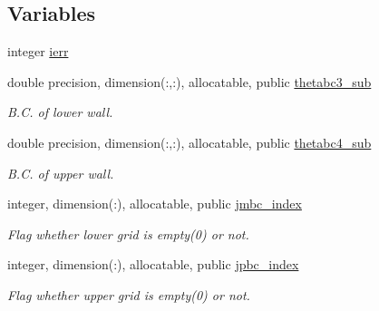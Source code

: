 \subsection*{Variables}
\begin{DoxyCompactItemize}
\item 
integer \mbox{\hyperlink{namespacemodule__mpi__subdomain_a180679cc4b2a39351cff87dcca079484}{ierr}}
\item 
double precision, dimension(\+:,\+:), allocatable, public \mbox{\hyperlink{namespacemodule__mpi__subdomain_a64208c4f25ace4acb038e217cc784f02}{thetabc3\+\_\+sub}}
\begin{DoxyCompactList}\small\item\em B.\+C. of lower wall. \end{DoxyCompactList}\item 
double precision, dimension(\+:,\+:), allocatable, public \mbox{\hyperlink{namespacemodule__mpi__subdomain_a63ecab89051a64282880083d20844204}{thetabc4\+\_\+sub}}
\begin{DoxyCompactList}\small\item\em B.\+C. of upper wall. \end{DoxyCompactList}\item 
integer, dimension(\+:), allocatable, public \mbox{\hyperlink{namespacemodule__mpi__subdomain_a1c2c2f77c74c40af73c7f65e3cba756e}{jmbc\+\_\+index}}
\begin{DoxyCompactList}\small\item\em Flag whether lower grid is empty(0) or not. \end{DoxyCompactList}\item 
integer, dimension(\+:), allocatable, public \mbox{\hyperlink{namespacemodule__mpi__subdomain_a9cf8549a75cc5cc0cd1541b2567c7dfd}{jpbc\+\_\+index}}
\begin{DoxyCompactList}\small\item\em Flag whether upper grid is empty(0) or not. \end{DoxyCompactList}\end{DoxyCompactItemize}
\textbf{ }\par
